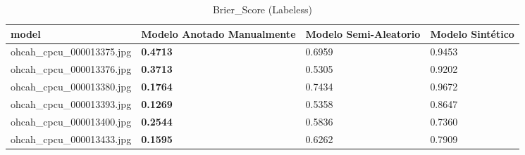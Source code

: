 \documentclass[twocolumn, fontsize=10pt]{article}
\begin{document}
\begin{table*}[ht]
\centering
\caption{Brier\_Score (Labeless)}
\label{tab:brier_score_labeless}
\setlength{\tabcolsep}{6pt}
\renewcommand{\arraystretch}{1.2}
\begin{tabular}{|l|l|l|l|}
\hline
model & Modelo Anotado Manualmente & Modelo Semi-Aleatorio & Modelo Sintético \\ \hline
ohcah\_cpcu\_000013375.jpg & \textbf{0.4713} & 0.6959 & 0.9453 \\ \hline
ohcah\_cpcu\_000013376.jpg & \textbf{0.3713} & 0.5305 & 0.9202 \\ \hline
ohcah\_cpcu\_000013380.jpg & \textbf{0.1764} & 0.7434 & 0.9672 \\ \hline
ohcah\_cpcu\_000013393.jpg & \textbf{0.1269} & 0.5358 & 0.8647 \\ \hline
ohcah\_cpcu\_000013400.jpg & \textbf{0.2544} & 0.5836 & 0.7360 \\ \hline
ohcah\_cpcu\_000013433.jpg & \textbf{0.1595} & 0.6262 & 0.7909 \\ \hline
\end{tabular}
\end{table*}
    
    
\end{document}
